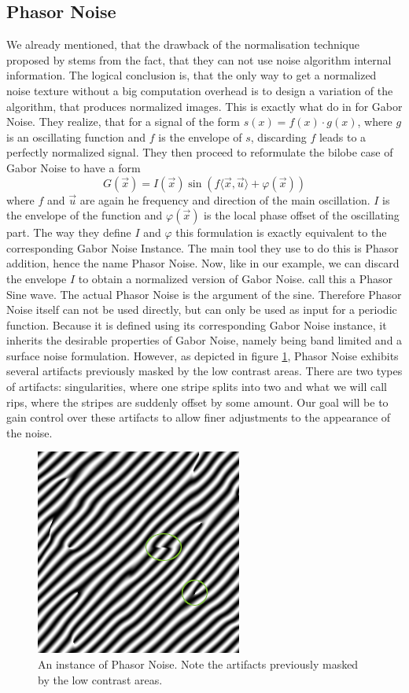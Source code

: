 \documentclass{utue} %
\begin{document}
\subsection{Phasor Noise}
We already mentioned, that the drawback of the normalisation technique proposed by \citeauthor{spectrumOfVariance} stems from the fact, that they can not use noise algorithm internal information. The logical conclusion is, that the only way to get a normalized noise texture without a big computation overhead is to design a variation of the algorithm, that produces normalized images. This is exactly what \citeauthor{phasorNoise} do in \cite{phasorNoise} for Gabor Noise. They realize, that for a signal of the form $s(x) = f(x)\cdot g(x)$, where $g$ is an oscillating function and $f$ is the envelope of $s$, discarding $f$ leads to a perfectly normalized signal. They then proceed to reformulate the bilobe case of Gabor Noise to have a form
$$
G(\vec{x}) = I(\vec{x})\sin{(f\langle\vec{x},\vec{u}\rangle + \varphi(\vec{x}))}
$$
where $f$ and $\vec{u}$ are again he frequency and direction of the main oscillation. $I$ is the envelope of the function and $\varphi(\vec{x})$ is the local phase offset of the oscillating part. The way they define $I$ and $\varphi$ this formulation is exactly equivalent to the corresponding Gabor Noise Instance. The main tool they use to do this is Phasor addition, hence the name Phasor Noise. Now, like in our example, we can discard the envelope $I$ to obtain a normalized version of Gabor Noise. \citeauthor{phasorNoise} call this a Phasor Sine wave. The actual Phasor Noise is the argument of the sine. Therefore Phasor Noise itself can not be used directly, but can only be used as input for a periodic function. Because it is defined using its corresponding Gabor Noise instance, it inherits the desirable properties of Gabor Noise, namely being band limited and a surface noise formulation. However, as depicted in figure \ref{fig:phasorNoise}, Phasor Noise exhibits several artifacts previously masked by the low contrast areas. There are two types of artifacts: singularities, where one stripe splits into two and what we will call rips, where the stripes are suddenly offset by some amount. Our goal will be to gain control over these artifacts to allow finer adjustments to the appearance of the noise.

\begin{figure}[h]
  \centering
  \includegraphics[width = 0.45\linewidth]{images/phasorSineWave}
  \caption{An instance of Phasor Noise. Note the artifacts previously masked by the low contrast areas.}\label{fig:phasorNoise}
\end{figure}
\end{document}

